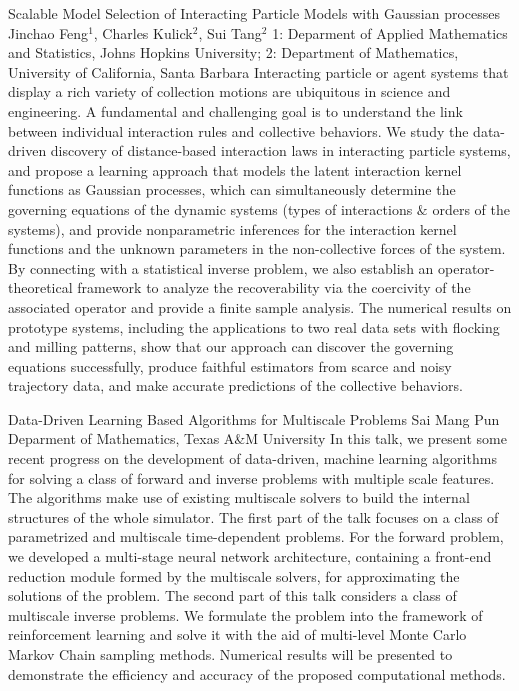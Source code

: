 \begin{addmargin}[2em]{0em}
\vspace{1.5ex}
\abs
{Scalable Model Selection of Interacting Particle Models with Gaussian processes}
{Jinchao Feng$^1$, Charles Kulick$^2$, Sui Tang$^2$}
{1: Deparment of Applied Mathematics and Statistics, Johns Hopkins University; 2: Department of Mathematics, University of California, Santa Barbara}
{Interacting particle or agent systems that display a rich variety of collection motions are ubiquitous in science and engineering. A fundamental and challenging goal is to understand the link between individual interaction rules and collective behaviors. We study the data-driven discovery of distance-based interaction laws in interacting particle systems, and propose a learning approach that models the latent interaction kernel functions as Gaussian processes, which can simultaneously determine the governing equations of the dynamic systems (types of interactions $\&$ orders of the systems), and provide nonparametric inferences for the interaction kernel functions and the unknown parameters in the non-collective forces of the system. By connecting with a statistical inverse problem, we also establish an operator-theoretical framework to analyze the recoverability via the coercivity of the associated operator and provide a finite sample analysis. The numerical results on prototype systems, including the applications to two real data sets with flocking and milling patterns, show that our approach can discover the governing equations successfully, produce faithful estimators from scarce and noisy trajectory data, and make accurate predictions of the collective behaviors.}


\vspace{1.5ex}
\abs
{Data-Driven Learning Based Algorithms for Multiscale Problems}
{Sai Mang Pun}
{Deparment of Mathematics, Texas A\&M University}
{In this talk, we present some recent progress on the development of data-driven, machine learning algorithms for solving a class of forward and inverse problems with multiple scale features. The algorithms make use of existing multiscale solvers to build the internal structures of the whole simulator. The first part of the talk focuses on a class of parametrized and multiscale time-dependent problems. For the forward problem, we developed a multi-stage neural network architecture, containing a front-end reduction module formed by the multiscale solvers, for approximating the solutions of the problem. The second part of this talk considers a class of multiscale inverse problems. We formulate the problem into the framework of reinforcement learning and solve it with the aid of multi-level Monte Carlo Markov Chain sampling methods. Numerical results will be presented to demonstrate the efficiency and accuracy of the proposed computational methods.}



\end{addmargin}
